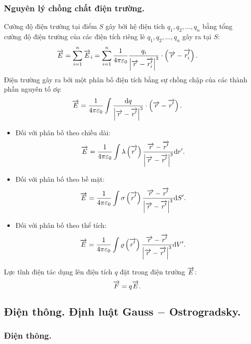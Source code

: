 \begin{appendices}
\subsubsection{Nguyên lý chồng chất điện trường.}
    Cường độ điện trường tại điểm $S$ gây bởi hệ điện tích $q_1,q_2,...,q_n$ bằng tổng cường độ điện trường của các điện tích riêng lẻ $q_1,q_2,...,q_n$ gây ra tại $S$:
    $$\overrightarrow{E}=\sum_{i=1}^{n}\overrightarrow{E}_i=\sum_{i=1}^{n}\dfrac{1}{4\pi \varepsilon_0}\dfrac{q_i}{\left|\overrightarrow{r}-\overrightarrow{r'_i}\right|^3}\cdot\left(\overrightarrow{r}-\overrightarrow{r'_i}\right).$$
    Điện trường gây ra bởi một phân bố điện tích bằng sự chồng chập của các thành phần nguyên tố $\dd q$:
    $$\overrightarrow{E}= \dfrac{1}{4\pi \varepsilon_0}\int\dfrac{\mathrm{d} q}{\left|\overrightarrow{r}-\overrightarrow{r'}\right|^3}\cdot\left(\overrightarrow{r}-\overrightarrow{r'}\right).$$
    \begin{itemize}
    \item Đối với phân bố theo chiều dài:
    $$\overrightarrow{E}= \dfrac{1}{4\pi \varepsilon_0}\int\lambda\left(\overrightarrow{r'}\right)\dfrac{\overrightarrow{r}-\overrightarrow{r'}}{\left|\overrightarrow{r}-\overrightarrow{r'}\right|^3}\mathrm{d} r'.$$
        \item Đối với phân bố theo bề mặt:
    $$\overrightarrow{E}=\dfrac{1}{4\pi \varepsilon_0}\int\sigma\left(\overrightarrow{r'}\right)\dfrac{\overrightarrow{r}-\overrightarrow{r'}}{\left|\overrightarrow{r}-\overrightarrow{r'}\right|^3}\mathrm{d} S'.$$
    \item Đối với phân bố theo thể tích:
    $$\overrightarrow{E}=\dfrac{1}{4\pi \varepsilon_0}\int\varrho\left(\overrightarrow{r'}\right)\dfrac{\overrightarrow{r}-\overrightarrow{r'}}{\left|\overrightarrow{r}-\overrightarrow{r'}\right|^3}\mathrm{d} V'.$$
    \end{itemize}
    
    
    Lực tĩnh điện tác dụng lên điện tích $q$ đặt trong điện trường $\overrightarrow{E}$:
    $$\overrightarrow{F}=q\overrightarrow{E}.$$
\subsection{Điện thông. Định luật Gauss $-$ Ostrogradsky.}
\subsubsection{Điện thông.}
\begin{center}
    

 
\tikzset{
pattern size/.store in=\mcSize, 
pattern size = 5pt,
pattern thickness/.store in=\mcThickness, 
pattern thickness = 0.3pt,
pattern radius/.store in=\mcRadius, 
pattern radius = 1pt}
\makeatletter
{}
\makeatother
{} %


\end{center}
\end{appendices}
